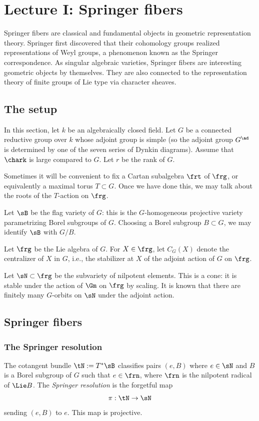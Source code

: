 \section{Lecture I: Springer fibers}

Springer fibers are classical and fundamental objects in geometric representation theory. Springer \cite{Springer} first discovered that their cohomology groups realized representations of Weyl groups, a phenomenon known as the Springer correspondence. As singular algebraic varieties, Springer fibers are interesting geometric objects by themselves. They are also connected to the representation theory of finite groups of Lie type via character sheaves.

\subsection{The setup}\label{ss:notation}  In this section, let $k$ be an algebraically closed field. Let $G$ be a connected reductive group over $k$ whose adjoint group is simple (so the adjoint group $G^{\ad}$ is determined by one of the seven series of Dynkin diagrams). Assume that $\chark$ is large compared to $G$.  Let $r$ be the rank of $G$.

Sometimes it will be convenient to fix a Cartan subalgebra $\frt$ of $\frg$, or equivalently a maximal torus $T\subset G$. Once we have done this, we may talk about the roots of the $T$-action on $\frg$.
 
Let $\sB$ be the flag variety of $G$: this is the $G$-homogeneous projective variety parametrizing Borel subgroups of $G$. Choosing a Borel subgroup $B\subset G$, we may identify $\sB$ with $G/B$.

Let $\frg$ be the Lie algebra of $G$.  For $X\in\frg$, let $C_{G}(X)$ denote the centralizer of $X$ in $G$, i.e., the stabilizer at $X$ of the adjoint action of $G$ on $\frg$. 

Let $\sN\subset\frg$ be the subvariety of nilpotent elements. This is a cone: it is stable under the action of $\Gm$ on $\frg$ by scaling.  It is known that there are finitely many $G$-orbits on $\sN$ under the adjoint action. 


\subsection{Springer fibers}

\subsubsection{The Springer resolution} The cotangent bundle $\tN:=T^{*}\sB$ classifies pairs $(e, B)$ where $e\in\sN$ and $B$ is a Borel subgroup of $G$ such that $e\in \frn$, where $\frn$ is the nilpotent radical of $\Lie B$. The {\em Springer resolution} is the forgetful map
\begin{equation*}
\pi:\tN\to\sN
\end{equation*}
sending $(e, B)$ to $e$. This map is projective.

